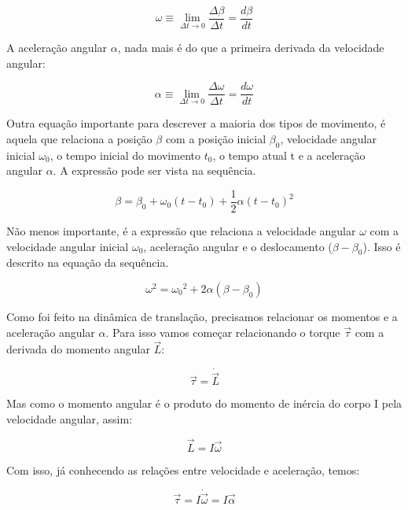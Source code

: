 \begin{equation}
\omega\equiv\lim_{\Delta t\rightarrow 0}\frac{\Delta\beta}{\Delta t}=\frac{d\beta}{dt}
\end{equation}

A aceleração angular $\alpha$, nada mais é do que a primeira derivada da velocidade angular:

\begin{equation}
\alpha\equiv\lim_{\Delta t\rightarrow 0}\frac{\Delta\omega}{\Delta t}=\frac{d\omega}{dt}
\end{equation}

Outra equação importante para descrever a maioria dos tipos de movimento, é aquela que relaciona a posição $\beta$ com a posição inicial $\beta_0$, velocidade angular inicial $\omega_0$, o tempo inicial do movimento $t_0$, o tempo atual t e a aceleração angular $\alpha$. A expressão pode ser vista na sequência.

\begin{equation}
\beta=\beta_{0}+\omega_{0}(t-t_{0})+\frac{1}{2}\alpha{(t-t_{0})}^{2}
\end{equation}

Não menos importante, é a expressão que relaciona a velocidade angular $\omega$ com a velocidade angular inicial $\omega_0$, aceleração angular e o deslocamento ($\beta-\beta_0$). Isso é descrito na equação da sequência.

\begin{equation}
{\omega}^{2}={\omega_0}^{2}+2\alpha(\beta-\beta_0) 
\end{equation}

Como foi feito na dinâmica de translação, precisamos relacionar os momentos e a aceleração angular $\alpha$. Para isso vamos começar relacionando o torque $\vec{\tau}$ com a derivada do momento angular $\vec{L}$:

\begin{equation}
\vec{\tau}=\dot{\vec{L}}
\end{equation}

Mas como o momento angular é o produto do momento de inércia do corpo I pela velocidade angular, assim: 

\begin{equation}\label{eq:iomega}
\vec{L}=I\vec{\omega}
\end{equation}

Com isso, já conhecendo as relações entre velocidade e aceleração, temos:  

\begin{equation}\label{iomega}
\vec{\tau}=I\dot{\vec{\omega}}=I\vec{\alpha}
\end{equation}

